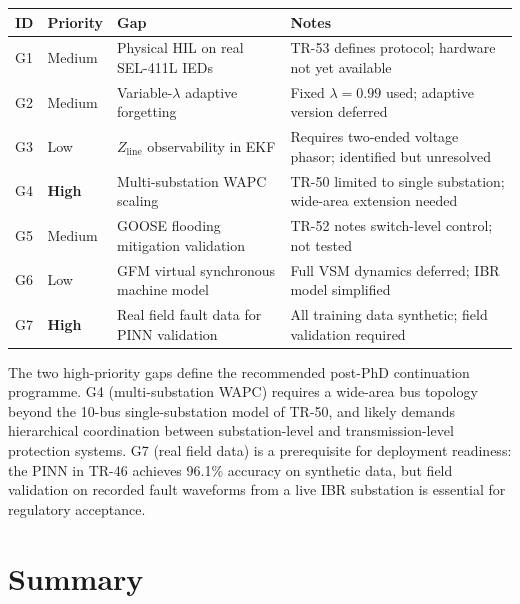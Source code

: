 \documentclass[11pt,a4paper]{article}
\begin{document}
\begin{center}
\begin{tabular}{@{}lllp{6.5cm}@{}}
\toprule
ID & Priority & Gap & Notes \\
\midrule
G1 & Medium & Physical HIL on real SEL-411L IEDs
   & TR-53 defines protocol; hardware not yet available \\
G2 & Medium & Variable-$\lambda$ adaptive forgetting
   & Fixed $\lambda=0.99$ used; adaptive version deferred \\
G3 & Low    & $Z_\mathrm{line}$ observability in EKF
   & Requires two-ended voltage phasor; identified but unresolved \\
G4 & \textbf{High} & Multi-substation WAPC scaling
   & TR-50 limited to single substation; wide-area extension needed \\
G5 & Medium & GOOSE flooding mitigation validation
   & TR-52 notes switch-level control; not tested \\
G6 & Low    & GFM virtual synchronous machine model
   & Full VSM dynamics deferred; IBR model simplified \\
G7 & \textbf{High} & Real field fault data for PINN validation
   & All training data synthetic; field validation required \\
\bottomrule
\end{tabular}
\end{center}

\medskip\noindent
The two high-priority gaps define the recommended post-PhD continuation
programme.  G4 (multi-substation WAPC) requires a wide-area bus topology
beyond the 10-bus single-substation model of TR-50, and likely demands
hierarchical coordination between substation-level and transmission-level
protection systems.  G7 (real field data) is a prerequisite for
deployment readiness: the PINN in TR-46 achieves 96.1\% accuracy on
synthetic data, but field validation on recorded fault waveforms from
a live IBR substation is essential for regulatory acceptance.

\section{Summary}
\label{sec:summary}
\end{document}
